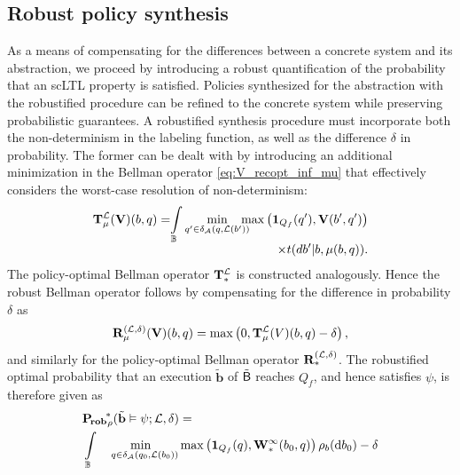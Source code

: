 \documentclass{ifacconf}
\begin{document}
\subsection{Robust policy synthesis}

As a means of compensating for the differences between a concrete system and its abstraction, we proceed by introducing a robust quantification of the probability that an scLTL property is satisfied. Policies synthesized for the abstraction with the robustified procedure can be refined to the concrete system while preserving probabilistic guarantees. A robustified synthesis procedure must incorporate both the non-determinism in the labeling function, as well as the difference $\delta$ in probability. The former can be dealt with by introducing an additional minimization in the Bellman operator \eqref{eq:V_recopt_inf_mu} that effectively considers the worst-case resolution of non-determinism:
\begin{align}
  \Bel_\pol^\Labset (\mathbf V)(b,q) = \hspace{-1mm} \int_\Xb
  \min_{q' \in \delta_\FSA(q, \Labset( b'))} \hspace{-3mm} \max \left( \mathbf 1_{Q_f}(q'), \mathbf V( b',q') \right)  \notag\\[-.4em]
   \times {\tr}(d b'|b,\pol(b,q)).\label{eq:V_recopt_nondet}
\end{align}
The policy-optimal Bellman operator ${\mathbf {T}}_\ast^{\mathcal{L}}$ is constructed analogously. Hence the robust Bellman operator follows by compensating for the difference in probability $\delta$ as 
\begin{equation}
  \label{eq:V_recopt_nondet_rob}
  {\mathbf {R}}_{\mu}^{(\mathcal{L},\delta)} (\mathbf V)(b,q) = \max \left( 0, {\mathbf {T}}_{\mu}^{\mathcal{L}} (V)(b,q) - \delta  \right),
\end{equation}
and similarly for the policy-optimal Bellman operator ${\mathbf {R}}_\ast^{(\mathcal{L}, \delta)}$. The robustified optimal probability that an execution $\tilde{\mathbf{b}}$ of $\tilde {\mathsf{B}}$ reaches $Q_f$, and hence satisfies $\psi$, is therefore given as
\begin{equation}
\label{eq:prob:robust_optimal}
\begin{aligned}
  &\mathbf{P_{\! rob}}_\init^{\!\ast} (\tilde{\mathbf{b}} \vDash \psi; \Labset,\delta) =\\ & \int_{\Xb}\  \min_{\ \ \bar q \in \delta_\FSA(q_0,\Labset(b_0))}  \max \left( \mathbf 1_{Q_f}(\bar q), \mathbf W^\infty_\ast(b_0,\bar q) \right) \initb(\mathrm{d} b_0) -\delta
\end{aligned}
\end{equation}
\end{document}
